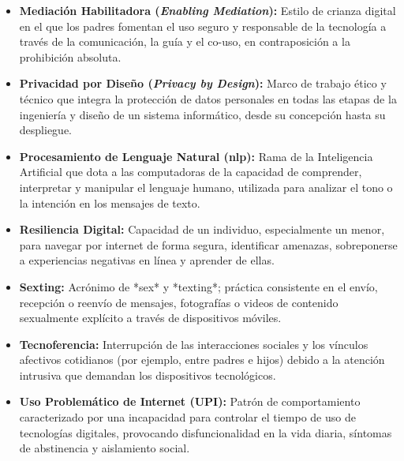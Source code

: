 \begin{itemize}
    \item[] \textbf{Mediación Habilitadora (\textit{Enabling Mediation}):} Estilo de crianza digital en el que los padres fomentan el uso seguro y responsable de la tecnología a través de la comunicación, la guía y el co-uso, en contraposición a la prohibición absoluta. \\
    
    \item[] \textbf{Privacidad por Diseño (\textit{Privacy by Design}):} Marco de trabajo ético y técnico que integra la protección de datos personales en todas las etapas de la ingeniería y diseño de un sistema informático, desde su concepción hasta su despliegue. \\
    
    \item[] \textbf{Procesamiento de Lenguaje Natural (\gls{nlp}):} Rama de la Inteligencia Artificial que dota a las computadoras de la capacidad de comprender, interpretar y manipular el lenguaje humano, utilizada para analizar el tono o la intención en los mensajes de texto. \\
    
    \item[] \textbf{Resiliencia Digital:} Capacidad de un individuo, especialmente un menor, para navegar por internet de forma segura, identificar amenazas, sobreponerse a experiencias negativas en línea y aprender de ellas. \\
    
    \item[] \textbf{Sexting:} Acrónimo de *sex* y *texting*; práctica consistente en el envío, recepción o reenvío de mensajes, fotografías o videos de contenido sexualmente explícito a través de dispositivos móviles. \\
    
    \item[] \textbf{Tecnoferencia:} Interrupción de las interacciones sociales y los vínculos afectivos cotidianos (por ejemplo, entre padres e hijos) debido a la atención intrusiva que demandan los dispositivos tecnológicos. \\
    
    \item[] \textbf{Uso Problemático de Internet (UPI):} Patrón de comportamiento caracterizado por una incapacidad para controlar el tiempo de uso de tecnologías digitales, provocando disfuncionalidad en la vida diaria, síntomas de abstinencia y aislamiento social. \\
    

\end{itemize}
